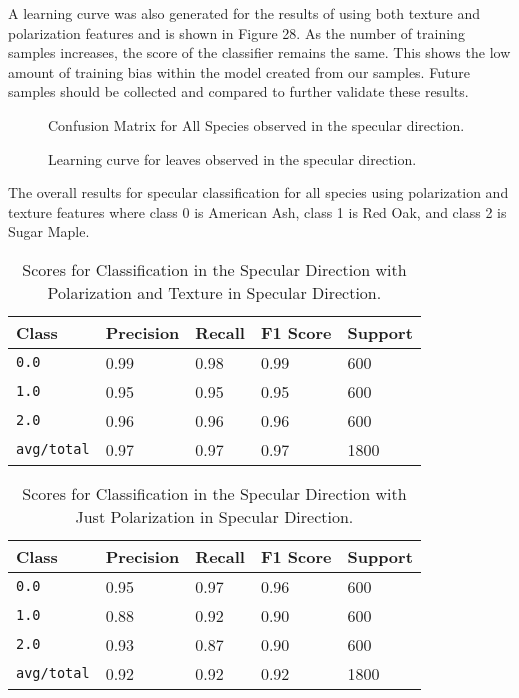 A learning curve was also generated for the results of using both texture and polarization features and is shown in Figure 28.  As the number of training samples increases, the score of the classifier remains the same.  This shows the low amount of training bias within the model created from our samples. Future samples should be collected and compared to further validate these results.
%
\begin{figure}[!htb]
    \begin{center}
    \end{center}
    \caption{Confusion Matrix for All Species observed in the specular direction.}
    \label{fig:polarization}
\end{figure}
%
%
\begin{figure}[!htb]
    \begin{center}
    \end{center}
    \caption{Learning curve for leaves observed in the specular direction.}
    \label{fig:polarization}
\end{figure}
%
The overall results for specular classification for all species using polarization and texture features where class 0 is American Ash, class 1 is Red Oak, and class 2 is Sugar Maple.
%
\begin{table}[htb]
  \centering
  \begin{tabular}{lllll}
    \toprule
    \textbf{Class} & \textbf{Precision} & \textbf{Recall} & \textbf{F1 Score} & \textbf{Support} \\
    \midrule
      \texttt{0.0} & 0.99 & 0.98 & 0.99 & 600 \\
      \texttt{1.0} & 0.95 & 0.95 & 0.95 & 600 \\
      \texttt{2.0} & 0.96 & 0.96 & 0.96 & 600 \\
      \texttt{avg/total} & 0.97 & 0.97 & 0.97 & 1800 \\
    \bottomrule
  \end{tabular}
  \caption{%
    Scores for Classification in the Specular Direction with Polarization and Texture in Specular Direction.
  }
  \label{tab:Packages}
\end{table}
\begin{table}[htb]
  \centering
  \begin{tabular}{lllll}
    \toprule
    \textbf{Class} & \textbf{Precision} & \textbf{Recall} & \textbf{F1 Score} & Support\\
    \midrule
      \texttt{0.0} & 0.95 & 0.97 & 0.96 & 600 \\
      \texttt{1.0} & 0.88 & 0.92 & 0.90 & 600 \\
      \texttt{2.0} & 0.93 & 0.87 & 0.90 & 600 \\
      \texttt{avg/total} & 0.92 & 0.92 & 0.92 & 1800 \\
    \bottomrule
  \end{tabular}
  \caption{%
    Scores for Classification in the Specular Direction with Just Polarization in Specular Direction.
  }
  \label{tab:Packages}
\end{table}
